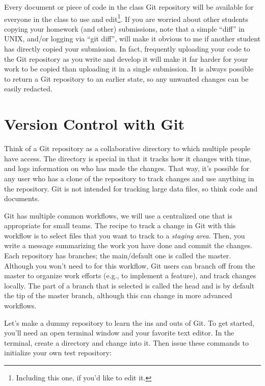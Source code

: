 \documentclass[12pt, letterpaper]{article}
\begin{document}
Every document or piece of code in the class Git repository will be available for everyone in the class to use and edit\footnote{Including this one, if you'd like to edit it.}.  If you are worried about other students copying your homework (and other) submissions, note that a simple ``diff'' in UNIX, and/or logging via ``git diff'', will make it obvious to me if another student has directly copied your submission.  In fact, frequently uploading your code to the Git repository as you write and develop it will make it far harder for your work to be copied than uploading it in a single submission.  It is always possible to return a Git repository to an earlier state, so any unwanted changes can be easily redacted.

\hypertarget{refbkmk3}{}
\section*{Version Control with Git}
Think of a Git repository as a collaborative directory to which multiple people have access.  The directory is special in that it tracks how it changes with time, and logs information on who has made the changes.  That way, it's possible for any user who has a clone of the repository to track changes and use anything in the repository.  Git is not intended for tracking large data files, so think code and documents.  

Git has multiple common workflows, we will use a centralized one that is appropriate for small teams.  The recipe to track a change in Git with this workflow is to select files that you want to track to a {\it staging area}.  Then, you write a message summarizing the work you have done and commit the changes.  Each repository has branches; the main/default one is called the master.  Although you won't need to for this workflow, Git users can branch off from the master to organize work efforts (e.g., to implement a feature), and track changes locally.  The part of a branch that is selected is called the head and is by default the tip of the master branch, although this can change in more advanced workflows.

Let's make a dummy repository to learn the ins and outs of Git.  To get started, you'll need an open terminal window and your favorite text editor.  In the terminal, create a directory and change into it.  Then issue these commands to initialize your own test repository: \\
\end{document}
